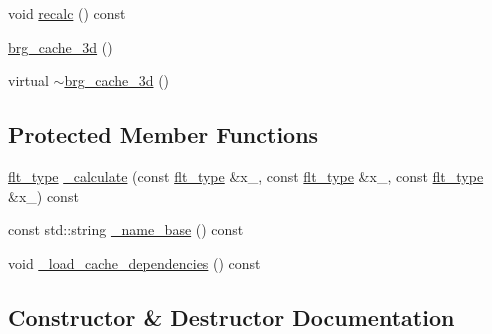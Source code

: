 \begin{DoxyCompactItemize}
\item 
void \hyperlink{classIceBRG_1_1brg__cache__3d_a7bd0994797bb6ae070b7a0e39d13e19f}{recalc} () const 
\item 
\hyperlink{classIceBRG_1_1brg__cache__3d_acba2966dffaf228ae82a96f23f8f3a88}{brg\+\_\+cache\+\_\+3d} ()
\item 
virtual \hyperlink{classIceBRG_1_1brg__cache__3d_a1609b9ff5f250df90c304f2615a404b9}{$\sim$brg\+\_\+cache\+\_\+3d} ()
\end{DoxyCompactItemize}
\subsection*{Protected Member Functions}
\begin{DoxyCompactItemize}
\item 
\hyperlink{lib_2IceBRG__main_2common_8h_ad0f130a56eeb944d9ef2692ee881ecc4}{flt\+\_\+type} \hyperlink{classIceBRG_1_1brg__cache__3d_aa3b16c143f747fc9b8adb2a9ca435b9d}{\+\_\+calculate} (const \hyperlink{lib_2IceBRG__main_2common_8h_ad0f130a56eeb944d9ef2692ee881ecc4}{flt\+\_\+type} \&x\+\_, const \hyperlink{lib_2IceBRG__main_2common_8h_ad0f130a56eeb944d9ef2692ee881ecc4}{flt\+\_\+type} \&x\+\_, const \hyperlink{lib_2IceBRG__main_2common_8h_ad0f130a56eeb944d9ef2692ee881ecc4}{flt\+\_\+type} \&x\+\_) const 
\item 
const std\+::string \hyperlink{classIceBRG_1_1brg__cache__3d_af934bb6a675f2a38b4da4092b35c6120}{\+\_\+name\+\_\+base} () const 
\item 
void \hyperlink{classIceBRG_1_1brg__cache__3d_af2bae1e53b83a8622392b264ab629843}{\+\_\+load\+\_\+cache\+\_\+dependencies} () const 
\end{DoxyCompactItemize}


\subsection{Constructor \& Destructor Documentation}
\hypertarget{classIceBRG_1_1brg__cache__3d_acba2966dffaf228ae82a96f23f8f3a88}{}
